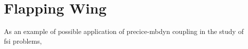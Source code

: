 
\section{Flapping Wing}

As an example of possible application of \acrshort{precice}-\acrshort{mbdyn} coupling in the study of \acrshort{fsi} problems, \cite{heathcote2008effect} 